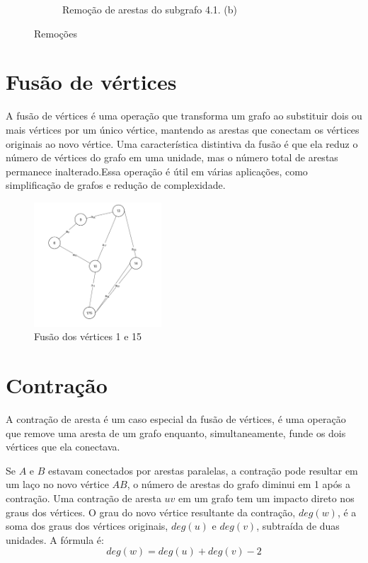 \documentclass[
12pt,
a4paper,
semrecuonosumario,
sumario = abnt-6027-2012]{report}
\begin{document}
\begin{figure}[!h]
\begin{subfigure}[b]{0.48\textwidth}
                \caption{Remoção de arestas do subgrafo 4.1. (b)}
                \label{fig:remocaoAresta}
            \end{subfigure}

            \caption{Remoções}
            \label{fig:duasRemocoes}
        \end{figure}

	\section{Fusão de vértices}\label{sec:fusao}
    A fusão de vértices é uma operação que transforma um grafo ao substituir dois ou mais vértices por um único vértice, mantendo as arestas que conectam os vértices originais ao novo vértice. Uma característica distintiva da fusão é que ela reduz o número de vértices do grafo em uma unidade, mas o número total de arestas permanece inalterado.Essa operação é útil em várias aplicações, como simplificação de grafos e redução de complexidade.

    \begin{figure}[!h]
        \centering
        \includegraphics[width=0.425\textwidth]{figuras/subgrafos/fusao.png}
        \caption{Fusão dos vértices 1 e 15}
            \label{fig:fusao}
    \end{figure}

	\section{Contração}\label{sec:contracao}
    A contração de aresta é um caso especial da fusão de vértices, é uma operação que remove uma aresta de um grafo enquanto, simultaneamente, funde os dois vértices que ela conectava.

    Se $A$ e $B$ estavam conectados por arestas paralelas, a contração pode resultar em um laço no novo vértice $AB$, o número de arestas do grafo diminui em 1 após a contração.
    Uma contração de aresta $uv$ em um grafo tem um impacto direto nos graus dos vértices. O grau do novo vértice resultante da contração, $deg(w)$, é a soma dos graus dos vértices originais, $deg(u)$ e $deg(v)$, subtraída de duas unidades. A fórmula é:
    \[
    deg(w) = deg(u) + deg(v) - 2
    \]
\end{document}
